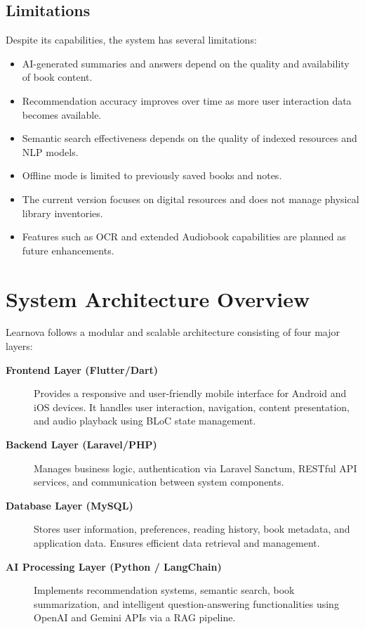 \subsection{Limitations}

Despite its capabilities, the system has several limitations:

\begin{itemize}
  \item AI-generated summaries and answers depend on the quality and
        availability of book content.
  \item Recommendation accuracy improves over time as more user interaction
        data becomes available.
  \item Semantic search effectiveness depends on the quality of indexed
        resources and NLP models.
  \item Offline mode is limited to previously saved books and notes.
  \item The current version focuses on digital resources and does not manage
        physical library inventories.
  \item Features such as OCR and extended Audiobook capabilities are planned
        as future enhancements.
\end{itemize}

\section{System Architecture Overview}
\label{sec:sysarch}

Learnova follows a modular and scalable architecture consisting of four major
layers:

\begin{description}
  \item[\textbf{Frontend Layer (Flutter/Dart)}]
    Provides a responsive and user-friendly mobile interface for Android and
    iOS devices. It handles user interaction, navigation, content presentation,
    and audio playback using BLoC state management.

  \item[\textbf{Backend Layer (Laravel/PHP)}]
    Manages business logic, authentication via Laravel Sanctum, RESTful API
    services, and communication between system components.

  \item[\textbf{Database Layer (MySQL)}]
    Stores user information, preferences, reading history, book metadata, and
    application data. Ensures efficient data retrieval and management.

  \item[\textbf{AI Processing Layer (Python / LangChain)}]
    Implements recommendation systems, semantic search, book summarization,
    and intelligent question-answering functionalities using OpenAI and Gemini
    APIs via a RAG pipeline.
\end{description}

